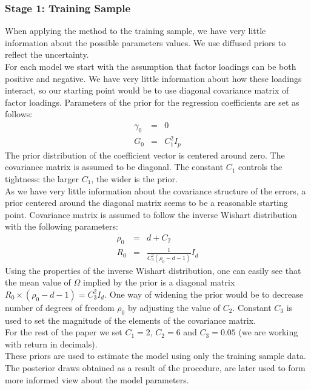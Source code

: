 \documentclass[12pt]{article}
\begin{document}
\subsubsection{Stage 1: Training Sample}
When applying the method to the training sample, we have very little information about the possible parameters values. We use diffused priors to reflect the uncertainty. \\
For each model we start with the assumption that factor loadings can be both positive and negative. We have very little information about how these loadings interact, so our starting point would be to use diagonal covariance matrix of factor loadings. 
Parameters of the prior for the regression coefficients are set as follows:
\begin{eqnarray*}
	\gamma_{0} &=& 0 \\ 
	G_{0} &=& C_{1}^{2}I_{p} 
\end{eqnarray*}
The prior distribution of the coefficient vector is centered around zero. The covariance matrix is assumed to be diagonal. The constant $C_{1}$ controls the tightness: the larger $C_{1}$, the wider is the prior.\\
As we have very little information about the covariance structure of the errors, a prior centered around the diagonal matrix seems to be a reasonable starting point. Covariance matrix is assumed to follow the inverse Wishart distribution with the following parameters:
\begin{eqnarray*}
	\rho_{0} &=& d + C_{2} \\ 
	R_{0} &=& \frac{1}{C_{3}^{2} (\rho_{0}-d-1)}I_{d}
\end{eqnarray*}
Using the properties of the inverse Wishart distribution, one can easily see that the mean value of $\Omega$ implied by the prior is a diagonal matrix $R_{0} \times(\rho_{0} - d- 1) = C_{3}^{2}I_{d}$. One way of widening the prior would be to decrease number of degrees of freedom $\rho_{0}$ by adjusting the value of $C_2$. Constant $C_{3}$ is used to set the magnitude of the elements of the covariance matrix. \\
For the rest of the paper we set $C_{1} = 2$, $C_{2} = 6$ and $C_{3} = 0.05$ (we are working with return in decimals).\\
These priors are used to estimate the model using only the training sample data. The posterior draws obtained as a result of the procedure, are later used to form more informed view about the model parameters.
\end{document}
